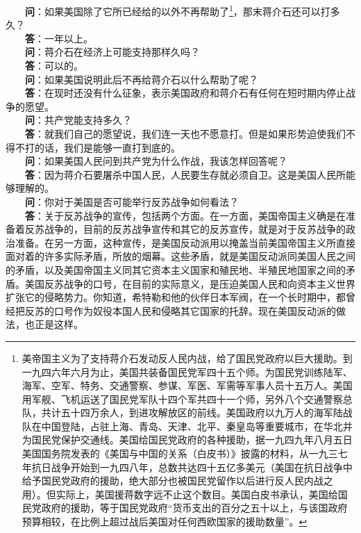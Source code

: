 \documentclass[cn,11pt,chinese]{elegantbook}
\begin{document}
　　\textbf{问}：如果美国除了它所已经给的以外不再帮助了\footnote[2]{ 美帝国主义为了支持蒋介石发动反人民内战，给了国民党政府以巨大援助。到一九四六年六月为止，美国共装备国民党军四十五个师。为国民党训练陆军、海军、空军、特务、交通警察、参谋、军医、军需等军事人员十五万人。美国用军舰、飞机运送了国民党军队十四个军共四十一个师，另外八个交通警察总队，共计五十四万余人，到进攻解放区的前线。美国政府以九万人的海军陆战队在中国登陆，占驻上海、青岛、天津、北平、秦皇岛等重要城市，在华北并为国民党保护交通线。美国给国民党政府的各种援助，据一九四九年八月五日美国国务院发表的《美国与中国的关系（白皮书）》披露的材料，从一九三七年抗日战争开始到一九四八年，总数共达四十五亿多美元（美国在抗日战争中给予国民党政府的援助，绝大部分也被国民党留作以后进行反人民内战之用）。但实际上，美国援蒋数字远不止这个数目。美国白皮书承认，美国给国民党政府的援助，等于国民党政府“货币支出的百分之五十以上，与该国政府预算相较，在比例上超过战后美国对任何西欧国家的援助数量”。}，那末蒋介石还可以打多久？\\
　　\textbf{答}：一年以上。\\
　　\textbf{问}：蒋介石在经济上可能支持那样久吗？\\
　　\textbf{答}：可以的。\\
　　\textbf{问}：如果美国说明此后不再给蒋介石以什么帮助了呢？\\
　　\textbf{答}：在现时还没有什么征象，表示美国政府和蒋介石有任何在短时期内停止战争的愿望。\\
　　\textbf{问}：共产党能支持多久？\\
　　\textbf{答}：就我们自己的愿望说，我们连一天也不愿意打。但是如果形势迫使我们不得不打的话，我们是能够一直打到底的。\\
　　\textbf{问}：如果美国人民问到共产党为什么作战，我该怎样回答呢？\\
　　\textbf{答}：因为蒋介石要屠杀中国人民，人民要生存就必须自卫。这是美国人民所能够理解的。\\
　　\textbf{问}：你对于美国是否可能举行反苏战争如何看法？\\
　　\textbf{答}：关于反苏战争的宣传，包括两个方面。在一方面，美国帝国主义确是在准备着反苏战争的，目前的反苏战争宣传和其它的反苏宣传，就是对于反苏战争的政治准备。在另一方面，这种宣传，是美国反动派用以掩盖当前美国帝国主义所直接面对着的许多实际矛盾，所放的烟幕。这些矛盾，就是美国反动派同美国人民之间的矛盾，以及美国帝国主义同其它资本主义国家和殖民地、半殖民地国家之间的矛盾。美国反苏战争的口号，在目前的实际意义，是压迫美国人民和向资本主义世界扩张它的侵略势力。你知道，希特勒和他的伙伴日本军阀，在一个长时期中，都曾经把反苏的口号作为奴役本国人民和侵略其它国家的托辞。现在美国反动派的做法，也正是这样。\\
\end{document}
